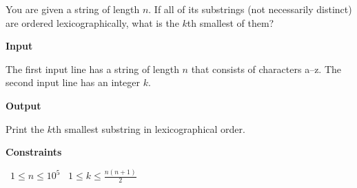 You are given a string of length $n$. If all of its substrings (not necessarily distinct) are ordered lexicographically, what is the $k$th smallest of them?

\vspace{0.3cm}\noindent\textbf{Input}

The first input line has a string of length $n$ that consists of characters a–z.
The second input line has an integer $k$.

\vspace{0.3cm}\noindent\textbf{Output}

Print the $k$th smallest substring in lexicographical order.

\vspace{0.3cm}\noindent\textbf{Constraints}

\textbullet\ $1 \le n \le 10^5$
\textbullet\ $1 \le k \le \frac{n(n+1)}{2}$